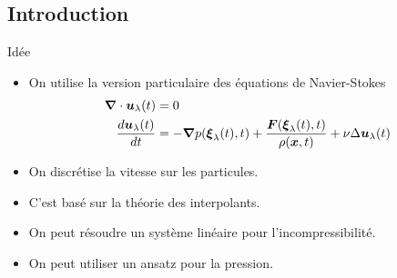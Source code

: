 \subsection{Introduction}
\begin{frame}[<+->]{Idée}
\begin{itemize}
\item On utilise la version particulaire des équations de Navier-Stokes
  \begin{align*}
{\boldsymbol {\nabla}} \cdot {\boldsymbol {u}}_{\lambda}(t)&=0\\
\frac{d {\boldsymbol {u}}_{\lambda}(t)}{d t}&=-{\boldsymbol {\nabla}} p({\boldsymbol {\xi}}_{\lambda}(t),t)+\frac{{\boldsymbol {F}}({\boldsymbol {\xi}}_{\lambda}(t),t)}{\rho({\boldsymbol {x}},t)}+\nu \Delta {\boldsymbol {u}}_{\lambda}(t)
 \end{align*}
 \item On discrétise la vitesse sur les particules.
 \item C'est basé sur la théorie des interpolants.
 \item On peut résoudre un système linéaire pour l'incompressibilité.
 \item On peut utiliser un ansatz pour la pression.
\end{itemize}
 
\end{frame}

